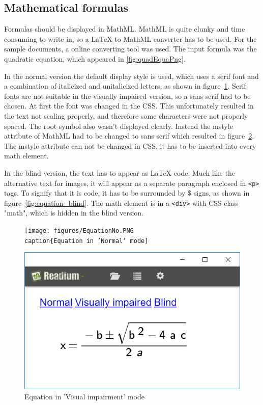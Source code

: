 \subsection{Mathematical formulas}

Formulas should be displayed in MathML. MathML is quite clunky and time consuming to write in, so a LaTeX to MathML converter has to be used. For the sample documents, a online converting tool was used. The input formula was the quadratic equation, which appeared in \ref{fig:quadEquaPng}.


In the normal version the default display style is used, which uses a serif font and a combination of italicized and unitalicized letters, as shown in figure~\ref{fig:equation_normal}. Serif fonts are not suitable in the visually impaired version, so a sans serif had to be chosen. At first the font was changed in the CSS. This unfortunately resulted in the text not scaling properly, and therefore some characters were not properly spaced. The root symbol also wasn't displayed clearly. Instead the mstyle attribute of MathML had to be changed to sans serif which resulted in figure~\ref{fig:equation_viimp}. The mstyle attribute can not be changed in CSS, it has to be inserted into every math element.


In the blind version, the text has to appear as LaTeX code. Much like the alternative text for images, it will appear as a separate paragraph enclosed in \lstinline|<p>|  tags. To signify that it is code, it has to be surrounded by \$ signs, as shown in figure~\ref{fig:equation_blind}. The math element is in a \lstinline|<div>| with CSS class "math", which is hidden in the blind version.


\begin{figure}
	\centering
	\texttt{[image: figures/EquationNo.PNG 
	\\caption\{Equation in 'Normal' mode]}
	\label{fig:equation_normal}
\end{figure}

\begin{figure}
	\centering
	\includegraphics[width=\linewidth*2/3]{figures/EquationVi.PNG}
	\caption{Equation in 'Visual impairment' mode}
	\label{fig:equation_viimp}
\end{figure}

